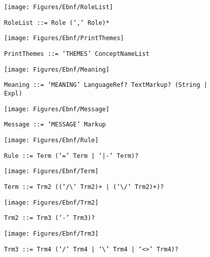  \begin{figure}[H]
  \centering
  \texttt{[image: Figures/Ebnf/RoleList]}
  \caption*{\texttt{RoleList \small::=  Role (`,' Role)*}}
  \label{fig:ebnf-RoleList}
 \end{figure}

 \begin{figure}[H]
  \centering
  \texttt{[image: Figures/Ebnf/PrintThemes]}
  \caption*{\texttt{PrintThemes \small::=  `THEMES' ConceptNameList}}
  \label{fig:ebnf-PrintThemes}
 \end{figure}

 \begin{figure}[H]
  \centering
  \texttt{[image: Figures/Ebnf/Meaning]}
  \caption*{\texttt{Meaning \small::=  `MEANING' LanguageRef? TextMarkup? (String | Expl)}}
  \label{fig:ebnf-Meaning}
 \end{figure}

 \begin{figure}[H]
  \centering
  \texttt{[image: Figures/Ebnf/Message]}
  \caption*{\texttt{Message \small::=  `MESSAGE' Markup}}
  \label{fig:ebnf-Message}
 \end{figure}

 \begin{figure}[H]
  \centering
  \texttt{[image: Figures/Ebnf/Rule]}
  \caption*{\texttt{Rule \small::=  Term (`=' Term | `|-' Term)?}}
  \label{fig:ebnf-Rule}
 \end{figure}

 \begin{figure}[H]
  \centering
  \texttt{[image: Figures/Ebnf/Term]}
  \caption*{\texttt{Term \small::=  Trm2 ((`/\textbackslash{}' Trm2)+ | (`\textbackslash{}/' Trm2)+)?}}
  \label{fig:ebnf-Term}
 \end{figure}

 \begin{figure}[H]
  \centering
  \texttt{[image: Figures/Ebnf/Trm2]}
  \caption*{\texttt{Trm2 \small::=  Trm3 (`-' Trm3)?}}
  \label{fig:ebnf-Trm2}
 \end{figure}

 \begin{figure}[H]
  \centering
  \texttt{[image: Figures/Ebnf/Trm3]}
  \caption*{\texttt{Trm3 \small::=  Trm4 (`/' Trm4 | `\textbackslash{}' Trm4 | `<>' Trm4)?}}
  \label{fig:ebnf-Trm3}
 \end{figure}

